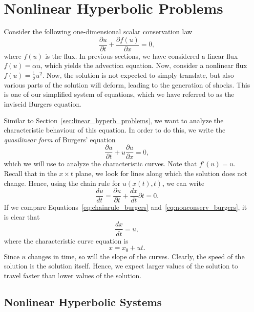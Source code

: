 \section{Nonlinear Hyperbolic Problems}
Consider the following one-dimensional scalar conservation law
\begin{equation}
	\frac{\partial u}{\partial t} + \frac{\partial f(u)}{\partial x} = 0,
\end{equation}
where $f(u)$ is the flux. In previous sections, we have considered a linear flux $f(u)=\alpha u$, which yields the advection equation. Now, consider a nonlinear flux $f(u)=\frac{1}{2}u^2$. Now, the solution is not expected to simply translate, but also various parts of the solution will deform, leading to the generation of shocks. This is one of our simplified system of equations, which we have referred to as the inviscid Burgers equation. 

Similar to Section~\ref{sec:linear_hyperb_problems}, we want to analyze the characteristic behaviour of this equation. In order to do this, we write the \textit{quasilinear form} of Burgers' equation
\begin{equation}
	\frac{\partial u}{\partial t} + u\frac{\partial u}{\partial x} = 0,
	\label{eq:nonconserv_burgers}
\end{equation}
which we will use to analyze the characteristic curves. Note that $f'(u) = u$. Recall that in the $x\times t$ plane, we look for lines along which the solution does not change. Hence, using the chain rule for $u(x(t), t)$, we can write
\begin{equation}
	\frac{du}{dt} = \frac{\partial u}{\partial t} + \frac{dx}{dt}{\partial t} = 0.
	\label{eq:chainrule_burgers}
\end{equation}
If we compare Equations~\ref{eq:chainrule_burgers} and~\ref{eq:nonconserv_burgers}, it is clear that 
\begin{equation}
	\frac{dx}{dt} = u,
\end{equation}
where the characteristic curve equation is
\begin{equation}
	x = x_0 + ut.
\end{equation}
Since $u$ changes in time, so will the slope of the curves. Clearly, the speed of the solution is the solution itself. Hence, we expect larger values of the solution to travel faster than lower values of the solution. 
\subsection{Nonlinear Hyperbolic Systems}
